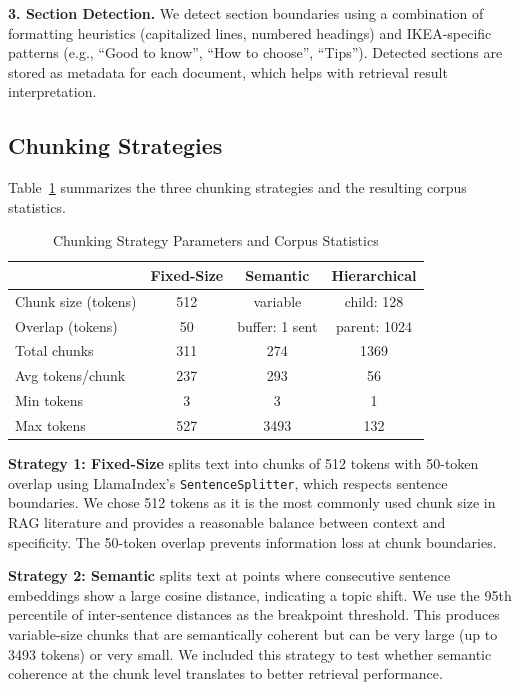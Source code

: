 \documentclass[conference]{IEEEtran}
\begin{document}
\textbf{3. Section Detection.} We detect section boundaries using a combination of formatting heuristics (capitalized lines, numbered headings) and IKEA-specific patterns (e.g., ``Good to know'', ``How to choose'', ``Tips''). Detected sections are stored as metadata for each document, which helps with retrieval result interpretation.

\subsection{Chunking Strategies}

Table~\ref{tab:chunking} summarizes the three chunking strategies and the resulting corpus statistics.

\begin{table}[htbp]
\caption{Chunking Strategy Parameters and Corpus Statistics}
\begin{center}
\begin{tabular}{lccc}
\toprule
& \textbf{Fixed-Size} & \textbf{Semantic} & \textbf{Hierarchical} \\
\midrule
Chunk size (tokens) & 512 & variable & child: 128 \\
Overlap (tokens) & 50 & buffer: 1 sent & parent: 1024 \\
Total chunks & 311 & 274 & 1369 \\
Avg tokens/chunk & 237 & 293 & 56 \\
Min tokens & 3 & 3 & 1 \\
Max tokens & 527 & 3493 & 132 \\
\bottomrule
\end{tabular}
\label{tab:chunking}
\end{center}
\end{table}

\textbf{Strategy 1: Fixed-Size} splits text into chunks of 512 tokens with 50-token overlap using LlamaIndex's \texttt{SentenceSplitter}, which respects sentence boundaries. We chose 512 tokens as it is the most commonly used chunk size in RAG literature and provides a reasonable balance between context and specificity. The 50-token overlap prevents information loss at chunk boundaries.

\textbf{Strategy 2: Semantic} splits text at points where consecutive sentence embeddings show a large cosine distance, indicating a topic shift. We use the 95th percentile of inter-sentence distances as the breakpoint threshold. This produces variable-size chunks that are semantically coherent but can be very large (up to 3493 tokens) or very small. We included this strategy to test whether semantic coherence at the chunk level translates to better retrieval performance.
\end{document}
